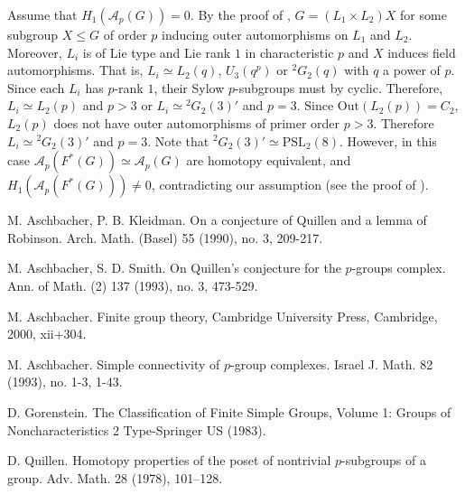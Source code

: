 \documentclass[11pt,twoside]{amsart}
\theoremstyle{plain}
\theoremstyle{definition}
\theoremstyle{remark}
\def\A{{\mathcal A}}
\def\PSL{{\text{PSL}}}
\def\Out{{\text{Out}}}
\begin{document}
Assume that $H_1(\A_p(G)) = 0$.  By the proof of \cite[10.3]{Asc93}, $G = (L_1\times L_2)X$ for some subgroup $X\leq G$ of order $p$ inducing outer automorphisms on $L_1$ and $L_2$. Moreover, $L_i$ is of Lie type and Lie rank $1$ in characteristic $p$ and $X$ induces field automorphisms. That is, $L_i \simeq L_2(q)$, $U_3(q^p)$ or ${}^2G_2(q)$ with $q$ a power of $p$. Since each $L_i$ has $p$-rank $1$, 
their Sylow $p$-subgroups must by cyclic. Therefore, $L_i \simeq L_2(p)$ and $p>3$ or $L_i\simeq {}^2G_2(3)'$ and $p = 3$. 
Since $\Out(L_2(p)) = C_2$, $L_2(p)$ does not have outer automorphisms of primer order $p > 3$. Therefore $L_i\simeq {}^2G_2(3)'$ and $p = 3$. Note that ${}^2G_2(3)' \simeq \PSL_2(8)$. However, in this case $\A_p(F^*(G)) \simeq \A_p(G)$ are homotopy equivalent, and $H_1(\A_p(F^*(G))) \neq 0$, contradicting our assumption (see the proof of \cite[10.3]{Asc93}).



\begin{thebibliography}{}

 M. Aschbacher, P. B. Kleidman. On a conjecture of Quillen and a lemma of Robinson. Arch. Math. (Basel) 55 (1990), no. 3, 209-217.

 M. Aschbacher, S. D. Smith. On Quillen's conjecture for the $p$-groups complex. Ann. of Math. (2) 137 (1993), no. 3, 473-529.

 M. Aschbacher. Finite group theory, Cambridge University Press, Cambridge, 2000, xii+304.

 M. Aschbacher. Simple connectivity of $p$-group complexes. Israel J. Math. 82 (1993), no. 1-3, 1-43.

 D. Gorenstein. The Classification of Finite Simple Groups, Volume 1: Groups of Noncharacteristics 2 Type-Springer US (1983).

 D. Quillen. Homotopy properties of the poset of nontrivial $p$-subgroups of a group. Adv. Math. 28 (1978), 101–128.
\end{thebibliography}
\end{document}
